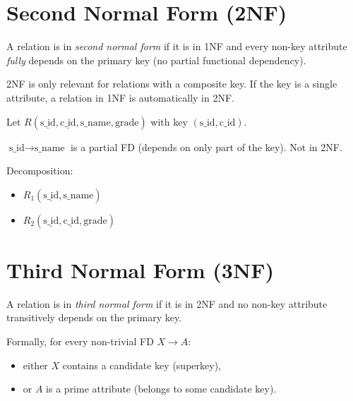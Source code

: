 \section{Second Normal Form (2NF)}

\begin{definition}[2NF]
A relation is in \emph{second normal form} if it is in 1NF and every
non-key attribute \emph{fully} depends on the primary key (no partial
functional dependency).
\end{definition}

\begin{remark}
2NF is only relevant for relations with a composite key. If the key is a
single attribute, a relation in 1NF is automatically in 2NF.
\end{remark}

\begin{example}
Let $R(\underline{\text{s\_id}}, \underline{\text{c\_id}}, \text{s\_name}, \text{grade})$
with key $(\text{s\_id}, \text{c\_id})$.

$\text{s\_id} \to \text{s\_name}$ is a partial FD (depends on only part of
the key). Not in 2NF.

Decomposition:
\begin{itemize}
    \item $R_1(\underline{\text{s\_id}}, \text{s\_name})$
    \item $R_2(\underline{\text{s\_id}}, \underline{\text{c\_id}}, \text{grade})$
\end{itemize}
\end{example}

\section{Third Normal Form (3NF)}

\begin{definition}[3NF]
A relation is in \emph{third normal form} if it is in 2NF and no non-key
attribute transitively depends on the primary key.

Formally, for every non-trivial FD $X \to A$:
\begin{itemize}
    \item either $X$ contains a candidate key (superkey),
    \item or $A$ is a prime attribute (belongs to some candidate key).
\end{itemize}
\end{definition}

